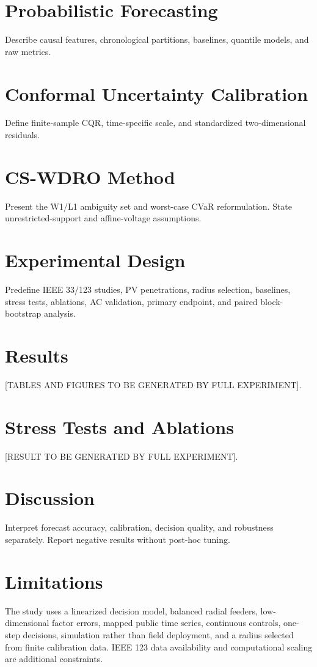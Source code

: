 \documentclass[10pt]{article}
\begin{document}
\section{Probabilistic Forecasting}
Describe causal features, chronological partitions, baselines, quantile models, and raw metrics.

\section{Conformal Uncertainty Calibration}
Define finite-sample CQR, time-specific scale, and standardized two-dimensional residuals.

\section{CS-WDRO Method}
Present the W1/L1 ambiguity set and worst-case CVaR reformulation. State unrestricted-support
and affine-voltage assumptions.

\section{Experimental Design}
Predefine IEEE 33/123 studies, PV penetrations, radius selection, baselines, stress tests,
ablations, AC validation, primary endpoint, and paired block-bootstrap analysis.

\section{Results}
[TABLES AND FIGURES TO BE GENERATED BY FULL EXPERIMENT].

\section{Stress Tests and Ablations}
[RESULT TO BE GENERATED BY FULL EXPERIMENT].

\section{Discussion}
Interpret forecast accuracy, calibration, decision quality, and robustness separately. Report
negative results without post-hoc tuning.

\section{Limitations}
The study uses a linearized decision model, balanced radial feeders, low-dimensional factor
errors, mapped public time series, continuous controls, one-step decisions, simulation rather
than field deployment, and a radius selected from finite calibration data. IEEE 123 data
availability and computational scaling are additional constraints.
\end{document}
